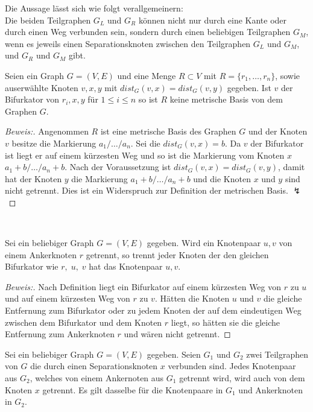   \begin{bem}
  \label{aussagetrennungsgraphen}
  Die Aussage lässt sich wie folgt verallgemeinern:\\
  Die beiden Teilgraphen $G_L$ und $G_R$ können nicht nur durch eine Kante oder durch einen Weg verbunden sein, sondern durch einen beliebigen Teilgraphen $G_M$, wenn es jeweils einen Separationsknoten zwischen den Teilgraphen $G_L$ und $G_M$, und $G_R$ und $G_M$ gibt.
  \end{bem}
\begin{lem}
\label{Bifurnachbar}
Seien ein Graph $G=(V,E)$ und eine Menge $R \subset V$ mit $R=\{r_1, \ldots , r_n\}$, sowie auserwählte Knoten $v,x,y$ mit $dist_G(v,x)=dist_G(v,y)$ gegeben. Ist $v$ der Bifurkator von $r_i,x,y$ für $1 \leq i \leq n$ so ist $R$ keine metrische Basis von dem Graphen $G$.
\end{lem}
\begin{proof}[Beweis:]
Angenommen $R$ ist eine metrische Basis des Graphen $G$ und der Knoten $v$ besitze die Markierung $a_1/\ldots /a_n$. Sei die $dist_G(v,x)=b$. Da $v$ der Bifurkator ist liegt er auf einem kürzesten Weg und so ist die Markierung vom Knoten $x$ $a_1+b/\ldots /a_n+b$. Nach der Voraussetzung ist $dist_G(v,x)=dist_G(v,y)$, damit hat der Knoten $y$ die Markierung $a_1+b/\ldots /a_n+b$ und die Knoten $x$ und $y$ sind nicht getrennt. Dies ist ein Widerspruch zur Definition der metrischen Basis. $\lightning$
\end{proof}
~ \linebreak
\vspace{-12mm}
\begin{lem}
\label{bifur}
Sei ein beliebiger Graph $G=(V,E)$ gegeben. Wird ein Knotenpaar $u,v$ von einem Ankerknoten $r$ getrennt, so trennt jeder Knoten der den gleichen Bifurkator wie $r,\;u,\;v$ hat das Knotenpaar $u,v$.
\end{lem}
\begin{proof}[Beweis:]
Nach Definition liegt ein Bifurkator auf einem kürzesten Weg von $r$ zu $u$ und auf einem kürzesten Weg von $r$ zu $v$. Hätten die Knoten $u$ und $v$ die gleiche Entfernung zum Bifurkator oder zu jedem Knoten der auf dem eindeutigen Weg zwischen dem Bifurkator und dem Knoten $r$ liegt, so hätten sie die gleiche Entfernung zum Ankerknoten $r$ und wären nicht getrennt.
\end{proof}
\begin{lem}
\label{trennungsknoten}
Sei ein beliebiger Graph $G=(V,E)$ gegeben. Seien $G_1$ und $G_2$ zwei Teilgraphen von $G$ die durch einen Separationsknoten $x$ verbunden sind. Jedes Knotenpaar aus $G_2$, welches von einem Ankernoten aus $G_1$ getrennt wird, wird auch von dem Knoten $x$ getrennt. Es gilt dasselbe für die Knotenpaare in $G_1$ und Ankerknoten in $G_2$.
\end{lem}
